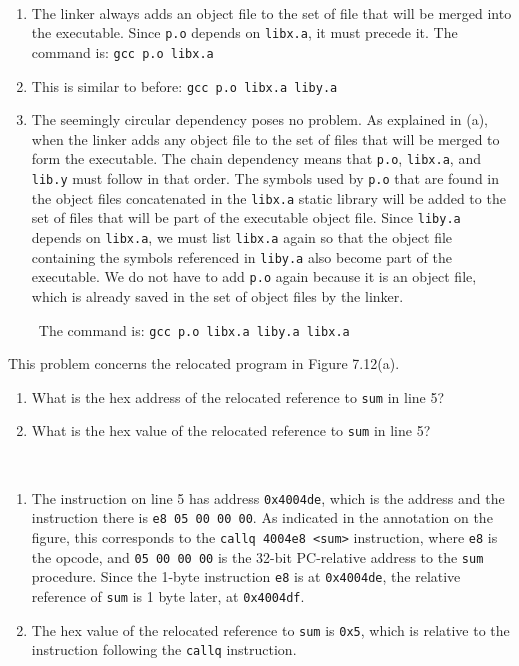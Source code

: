 \documentclass[12pt]{article}
\newenvironment{ex}[2][Exercise]{\begin{trivlist}
		\item[\hskip \labelsep {\bfseries #1}\hskip \labelsep {\bfseries #2.}]}{\end{trivlist}}
\newenvironment{sol}[1][Solution]{\begin{trivlist}
		\item[\hskip \labelsep {\bfseries #1:}]}{\end{trivlist}}
\begin{document}
\begin{sol}
	\
	\begin{enumerate}[label=(\alph*)]
		\item The linker always adds an object file to the set of file that will be merged into
		the executable. Since \texttt{p.o} depends on \texttt{libx.a}, it must precede it. The
		command is: \texttt{gcc p.o libx.a}
		\item This is similar to before: \texttt{gcc p.o libx.a liby.a}
		\item The seemingly circular dependency poses no problem. As explained in (a), when the
		linker adds any object file to the set of files that will be merged to form the executable.
		The chain dependency means that \texttt{p.o}, \texttt{libx.a}, and \texttt{lib.y} must follow
		in that order. The symbols used by \texttt{p.o} that are found in the object files concatenated
		in the \texttt{libx.a} static library will be added to the set of files that will be part of
		the executable object file. Since \texttt{liby.a} depends on \texttt{libx.a}, we must list
		\texttt{libx.a} again so that the object file containing the symbols referenced in \texttt{liby.a}
		also become part of the executable. We do not have to add \texttt{p.o} again because it is
		an object file, which is already saved in the set of object files by the linker.
		
		\
		The command is: \texttt{gcc p.o libx.a liby.a libx.a}
	\end{enumerate}
\end{sol}

\begin{ex}{7.4}
	This problem concerns the relocated program in Figure 7.12(a).
	\begin{enumerate}[label=(\alph*)]
		\item What is the hex address of the relocated reference to \texttt{sum} in line 5?
		\item What is the hex value of the relocated reference to \texttt{sum} in line 5?
	\end{enumerate}
\end{ex}

\begin{sol}
	\
	\begin{enumerate}[label=(\alph*)]
		\item The instruction on line 5 has address \texttt{0x4004de}, which is the address
		and the instruction there is \texttt{e8 05 00 00 00}. As indicated in the annotation
		on the figure, this corresponds to the \texttt{callq 4004e8 <sum>} instruction, where
		\texttt{e8} is the opcode, and \texttt{05 00 00 00} is the 32-bit PC-relative address
		to the \texttt{sum} procedure. Since the 1-byte instruction \texttt{e8} is at \texttt{0x4004de},
		the relative reference of \texttt{sum} is 1 byte later, at \texttt{0x4004df}.
		
		\item The hex value of the relocated reference to \texttt{sum} is \texttt{0x5},
		which is relative to the instruction following the \texttt{callq} instruction.
	\end{enumerate}
\end{sol}
\end{document}
